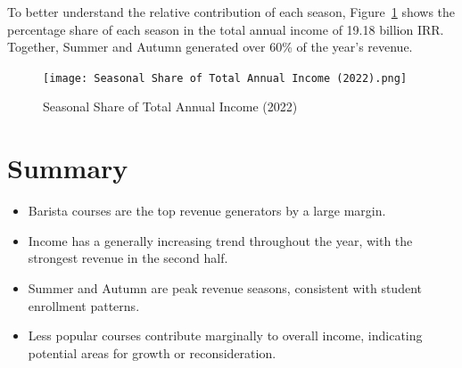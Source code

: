 \documentclass[12pt,a4paper]{article}
\begin{document}
To better understand the relative contribution of each season, Figure~\ref{fig:seasonal-share} shows the percentage share of each season in the total annual income of 19.18 billion IRR. Together, Summer and Autumn generated over 60\% of the year's revenue.

\begin{figure}[h!]
    \centering
    \texttt{[image: Seasonal Share of Total Annual Income (2022).png]}
    \caption{Seasonal Share of Total Annual Income (2022)}
    \label{fig:seasonal-share}
\end{figure}

\section*{Summary}

\begin{itemize}
    \item Barista courses are the top revenue generators by a large margin.
    \item Income has a generally increasing trend throughout the year, with the strongest revenue in the second half.
    \item Summer and Autumn are peak revenue seasons, consistent with student enrollment patterns.
    \item Less popular courses contribute marginally to overall income, indicating potential areas for growth or reconsideration.
\end{itemize}
\end{document}
